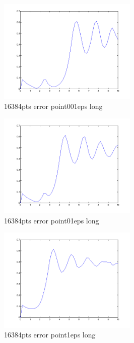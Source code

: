 \documentclass{beamer}
\theoremstyle{plain}
\theoremstyle{definition}
\begin{document}
\frame
{
\begin{figure}
\begin{center}
\includegraphics[width=250px]{16384pts_error_point001eps_long.png}\\
16384pts error point001eps long
\end{center}
\end{figure}
}

\frame
{
\begin{figure}
\begin{center}
\includegraphics[width=250px]{16384pts_error_point01eps_long.png}\\
16384pts error point01eps long
\end{center}
\end{figure}
}

\frame
{
\begin{figure}
\begin{center}
\includegraphics[width=250px]{16384pts_error_point1eps_long.png}\\
16384pts error point1eps long
\end{center}
\end{figure}
}
\end{document}
